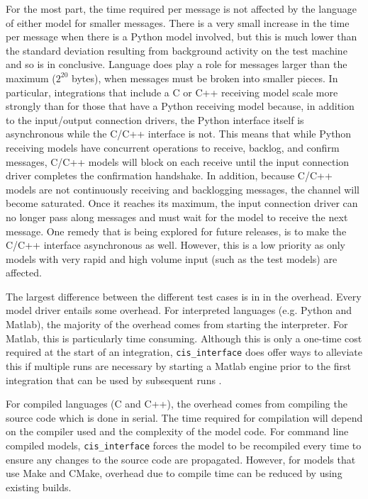 \documentclass[journal]{IEEEtran}
\newcommand{\todo}[1]{{\color{red}{#1}}}
\newcommand{\cis}{{\tt cis\_interface}{}}
\begin{document}
%
For the most part, the time required per message is not affected by the language of either model for smaller messages. There is a very small increase in the time per message when there is a Python model involved, but this is much lower than the standard deviation resulting from background activity on the test machine and so is in conclusive. Language does play a role for messages larger than the maximum ($2^{20}$ bytes), when messages must be broken into smaller pieces. In particular, integrations that include a C or C++ receiving model scale more strongly than for those that have a Python receiving model because, in addition to the input/output connection drivers, the Python interface itself is asynchronous while the C/C++ interface is not. This means that while Python receiving models have concurrent operations to receive, backlog, and confirm messages, C/C++ models will block on each receive until the input connection driver completes the confirmation handshake. In addition, because C/C++ models are not continuously receiving and backlogging messages, the channel will become saturated. Once it reaches its maximum, the input connection driver can no longer pass along messages and must wait for the model to receive the next message. One remedy that is being explored for future releases, is to make the C/C++ interface asynchronous as well. However, this is a low priority as only models with very rapid and high volume input (such as the test models) are affected.

The largest difference between the different test cases is in in the overhead. Every model driver entails some overhead. For interpreted languages (e.g. Python and Matlab), the majority of the overhead comes from starting the interpreter. For Matlab, this is particularly time consuming. Although this is only a one-time cost required at the start of an integration, {\cis} does offer ways to alleviate this if multiple runs are necessary by starting a Matlab engine prior to the first integration that can be used by subsequent runs \todo{(results that include existing Matlab engine)}.

For compiled languages (C and C++), the overhead comes from compiling the source code which is done in serial. The time required for compilation will depend on the compiler used and the complexity of the model code. For command line compiled models, {\cis} forces the model to be recompiled every time to ensure any changes to the source code are propagated. However, for models that use Make and CMake, overhead due to compile time can be reduced by using existing builds.
\end{document}
